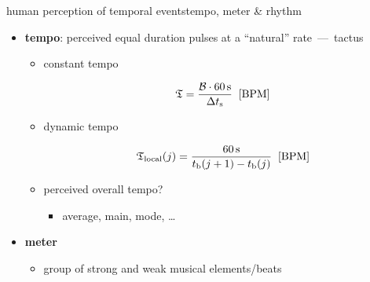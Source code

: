         \begin{frame}{human perception of temporal events}{tempo, meter \& rhythm}
            \vspace{-2mm}
            \begin{itemize}
                \item	\textbf{tempo}: perceived equal duration pulses at a ``natural'' rate~---~tactus
                    \begin{itemize}
                        
                        \item<1->	constant tempo
                            \begin{footnotesize}
                            \begin{equation*}\label{eq:tempo_mean}
                                \mathfrak{T} = \frac{ \mathcal{B}\cdot \unit[60]{s}}{\Delta t_\mathrm{s}}\;\; [\unit{BPM}] 
                            \end{equation*}
                            \end{footnotesize}
                        \item<1->	dynamic tempo
                            \begin{footnotesize}
                            \begin{equation*}
                                \mathfrak{T}_\mathrm{local}(j) = \frac{\unit[60]{s}}{t_\mathrm{b}(j+1)-t_\mathrm{b}(j)}\;\; [\unit{BPM}] 
                            \end{equation*}
                            \end{footnotesize}
                            
                            
                        \item    perceived overall tempo?
                            \begin{itemize}
                                \item	average, main, mode, \ldots
                            \end{itemize}
                    \end{itemize}
                \smallskip                
                \item<2->	\textbf{meter}
                    \begin{itemize}
                        \item	group of strong and weak musical elements/beats
                        

\end{itemize}
\end{itemize}
\end{frame}
